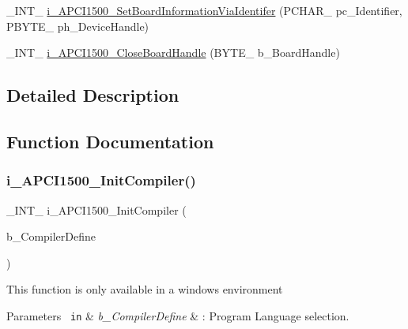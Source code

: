 \begin{DoxyCompactItemize}
\item 
\+\_\+\+I\+N\+T\+\_\+ \mbox{\hyperlink{group___general_functions_ga6fb479af554a572f5594396aea20c140}{i\+\_\+\+A\+P\+C\+I1500\+\_\+\+Set\+Board\+Information\+Via\+Identifer}} (P\+C\+H\+A\+R\+\_\+ pc\+\_\+\+Identifier, P\+B\+Y\+T\+E\+\_\+ ph\+\_\+\+Device\+Handle)
\item 
\+\_\+\+I\+N\+T\+\_\+ \mbox{\hyperlink{group___general_functions_gacc51dee7372881d5a7db587b038044a5}{i\+\_\+\+A\+P\+C\+I1500\+\_\+\+Close\+Board\+Handle}} (B\+Y\+T\+E\+\_\+ b\+\_\+\+Board\+Handle)
\end{DoxyCompactItemize}


\subsection{Detailed Description}


\subsection{Function Documentation}
\mbox{\label{group___general_functions_ga283828f6037ecf34146ddeba2ffa2012}} 
\subsubsection{\texorpdfstring{i\_APCI1500\_InitCompiler()}{i\_APCI1500\_InitCompiler()}}
{\footnotesize\ttfamily \+\_\+\+I\+N\+T\+\_\+ i\+\_\+\+A\+P\+C\+I1500\+\_\+\+Init\+Compiler (\begin{DoxyParamCaption}\item[{B\+Y\+T\+E\+\_\+}]{b\+\_\+\+Compiler\+Define }\end{DoxyParamCaption})}

This function is only available in a windows environment 
\begin{DoxyParams}[1]{Parameters}
\mbox{\texttt{ in}}  & {\em b\+\_\+\+Compiler\+Define} & \+: Program Language selection.\\
\hline
\end{DoxyParams}

